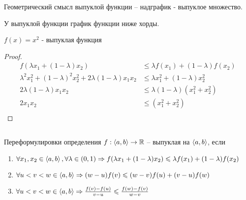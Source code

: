 \quad

\begin{remark}
    Геометрический смысл выпуклой функции -- надграфик - выпуклое множество.
\end{remark}

\begin{remark}
    У выпуклой функции график функции ниже хорды.
\end{remark}

\begin{example}
    $f(x) = x ^ 2$ - выпуклая функция
\end{example}

\begin{proof}
\begin{equation*}
\begin{aligned}
    f(\lambda x_1 + (1-\lambda) x_2) &\leqslant \lambda f(x_1) + (1 - \lambda) f(x_2) \\
    \lambda ^ 2 x_1 ^ 2 + (1 - \lambda) ^ 2 x_2 ^ 2 + 2 \lambda (1 - \lambda) x_1 x_2 &\leqslant \lambda x_1^2 + (1 - \lambda) x_2^2 \\
    2 \lambda (1 - \lambda) x_1 x_2 &\leqslant \lambda (1 - \lambda)  (x_1^2 +  x_2^2) \\
    2 x_1 x_2 &\leqslant (x_1^2 +  x_2^2) \\
\end{aligned}
\end{equation*}
\end{proof}

\subsection*{}
\begin{namedlemma}{Переформулировки определения}
    $f : \left\langle {a, b} \right\rangle \to \mathbb{R} $ -- выпуклая на $\left\langle {a,b} \right\rangle$, если
    \begin{enumerate}
        \item  $\forall x_1, x_2 \in \left\langle {a,b} \right\rangle, \forall \lambda \in (0, 1) \Rightarrow  f(\lambda x_1 + (1 - \lambda) x _ 2) \leqslant \lambda f(x_1) + (1 - \lambda) f (x _ 2)$
        \item  $\forall u < v < w \in \left\langle {a,b} \right\rangle \Rightarrow  (w - u) f(v) \leqslant (w - v) f(u) + (v - u) f(w)$
        \item  $\forall u < v < w \in \left\langle {a,b} \right\rangle \Rightarrow  \frac{f(v) - f(u)}{v - u} \leqslant \frac{f(w) - f(v)}{w - v}$
    \end{enumerate}
\end{namedlemma}


